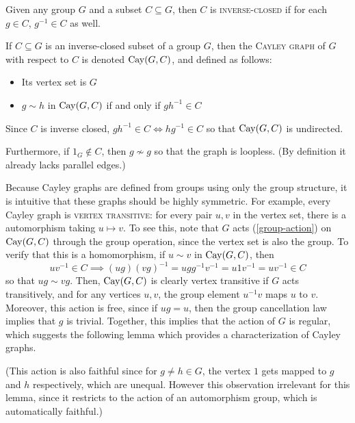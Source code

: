 \documentclass{report}
\begin{document}
    \begin{defn}\label{cayley-graph}
      Given any group $G$ and a subset $C \subseteq G$,
      then $C$ is \textsc{inverse-closed} if for each $g \in C$,
      $g^{-1} \in C$ as well.

      If $C \subseteq G$ is an inverse-closed subset of a group $G$,
      then the \textsc{Cayley graph} of $G$ with respect to $C$ is denoted
      $\operatorname{Cay}(G, C)$, and defined as follows:
      \begin{itemize}
        \item Its vertex set is $G$
        \item $g \sim h$ in $\operatorname{Cay}(G, C)$ if and only if $gh^{-1} \in C$
      \end{itemize}

      Since $C$ is inverse closed, $gh^{-1} \in C \iff hg^{-1} \in C$
      so that $\operatorname{Cay}(G, C)$ is undirected.

      Furthermore, if $1_G \not\in C$, then $g \not\sim g$ so that the graph is
      loopless.  (By definition it already lacks parallel edges.)
    \end{defn}

    Because Cayley graphs are defined from groups using only the group
    structure, it is intuitive that these graphs should be highly symmetric.
    For example, every Cayley graph is \textsc{vertex transitive}: for every
    pair $u, v$ in the vertex set, there is a automorphism taking $u \mapsto v$.
    To see this, note that $G$ acts (\ref{group-action}) on $\operatorname{Cay}(G, C)$ through
    the group operation, since the vertex set is also the group.
    To verify that this is a homomorphism, if $u \sim v$ in $\operatorname{Cay}(G, C)$, then
    $$
      uv^{-1} \in C
      \implies (ug)(vg)^{-1} = ugg^{-1}v^{-1} = u 1 v^{-1} = u v^{-1} \in C
    $$
    so that $ug \sim vg$.
    Then, $\operatorname{Cay}(G, C)$ is clearly vertex transitive if $G$ acts transitively,
    and for any vertices $u, v$, the group element $u^{-1} v$ maps $u$ to $v$.
    Moreover, this action is free, since if $ug = u$, then the group
    cancellation law implies that $g$ is trivial.
    Together, this implies that the action of $G$ is regular,
    which suggests the following lemma which provides a characterization of
    Cayley graphs.

    (This action is also faithful since for $g \neq h \in G$, the vertex $1$
    gets mapped to $g$ and $h$ respectively, which are unequal.  However this
    observation irrelevant for this lemma, since it restricts to the action of
    an automorphism group, which is automatically faithful.)
\end{document}
